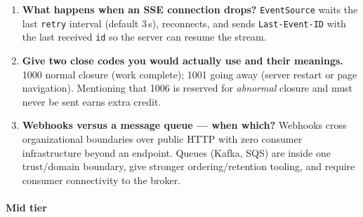 \begin{enumerate}[label=\textbf{Q\arabic*.}, leftmargin=1.6cm]
        once --- typically by recording the event id and skipping duplicates.
        Needed because delivery is at-least-once: providers retry whenever
        the 2xx is lost, so duplicates are guaranteed.
  \item \textbf{What happens when an SSE connection drops?}
        \texttt{EventSource} waits the last \texttt{retry} interval (default
        3\,s), reconnects, and sends \texttt{Last-Event-ID} with the last
        received \texttt{id} so the server can resume the stream.
  \item \textbf{Give two close codes you would actually use and their
        meanings.}
        1000 normal closure (work complete); 1001 going away (server restart
        or page navigation). Mentioning that 1006 is reserved for
        \emph{abnormal} closure and must never be sent earns extra credit.
  \item \textbf{Webhooks versus a message queue --- when which?}
        Webhooks cross organizational boundaries over public HTTP with zero
        consumer infrastructure beyond an endpoint. Queues (Kafka, SQS) are
        inside one trust/domain boundary, give stronger ordering/retention
        tooling, and require consumer connectivity to the broker.
\end{enumerate}

\paragraph{Mid tier}

